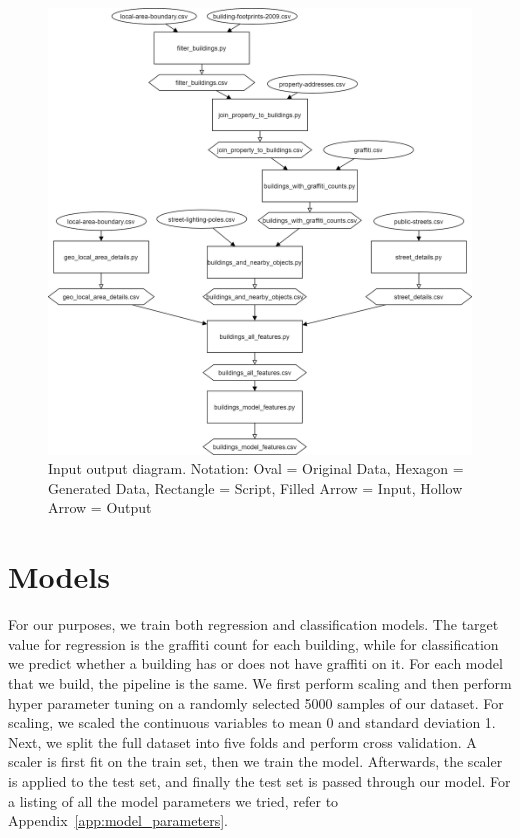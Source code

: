 \begin{figure}
   \centering
   \includegraphics[width=\textwidth]{images/MethodologyInputOutputDiagram.png}
   \caption{Input output diagram. Notation: Oval = Original Data, Hexagon = Generated Data, Rectangle = Script, Filled Arrow = Input, Hollow Arrow = Output}
   \label{fig:methodology}
\end{figure}


\section{Models}

For our purposes, we train both regression and classification models. The target value for regression is the graffiti count for each building, while for classification we predict whether a building has or does not have graffiti on it. For each model that we build, the pipeline is the same. We first perform scaling and then perform hyper parameter tuning on a randomly selected 5000 samples of our dataset. For scaling, we scaled the continuous variables to mean 0 and standard deviation 1. Next, we split the full dataset into five folds and perform cross validation. A scaler is first fit on the train set, then we train the model. Afterwards, the scaler is applied to the test set, and finally the test set is passed through our model. For a listing of all the model parameters we tried, refer to Appendix~\ref{app:model_parameters}.

